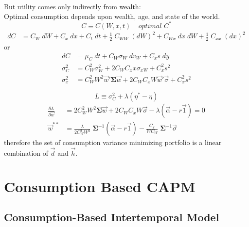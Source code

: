\documentclass[
14pt,notheorems,hyperref={pdfauthor=whatever}
]{beamer}
\begin{document}
\begin{frame}
But utility comes only indirectly from wealth:\\
\hfill\break
Optimal consumption depends upon wealth, age, and state of the world.
\[ C \equiv C(W,x,t) \;\;\;\; \textit{optimal $C^*$}\]
\begin{align*}
    dC &= C_W\;dW + C_x\;dx+C_t\;dt + \frac{1}{2}\;C_{WW}\;(dW)^2 + C_{Wx}\;dx\;dW + \frac{1}{2}\;C_{xx}\;(dx)^2
\end{align*}
or
\begin{align*}
    dC &= \mu_C\;dt + C_W\sigma_W\;dv_W+C_xs\;dy\\
    \sigma_C^2 &= C_W^2\sigma_W^2 + 2 C_W C_xx \sigma_{xW} + C_x^2s^2\\
    \sigma_x^2 &= C_W^2 W^2 \vec{w}'\bm{\Sigma} \vec{w} + 2 C_W C_x W \vec{w}' \vec\sigma + C_x^2 s^2
\end{align*}
\end{frame}

\begin{frame}
\[ L \equiv \sigma_C^2 + \lambda(\eta^* - \eta)\]
\begin{align*}
    \frac{\partial L}{\partial \vec{w}} &= 2 C_W^2 W^2 \bm{\Sigma} \vec{w} + 2 C_W C_x W \vec\sigma - \lambda(\vec\alpha-r\vec1)=0\\
    \vec{w}^{**} &= \frac{\lambda}{2 C_W^2 W^2}\;\bm{\Sigma}^{-1}(\vec\alpha-r\vec1) - \frac{C_x}{W C_W}\;\bm{\Sigma}^{-1}\vec\sigma
\end{align*}
therefore the set of consumption variance minimizing portfolio is a linear combination of $\vec{d}$ and $\vec{h}$.
\end{frame}

\section{Consumption Based CAPM}

\subsection{Consumption-Based Intertemporal Model}
\end{document}
